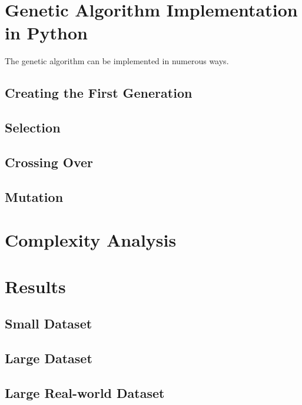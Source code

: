 \documentclass[UTF8]{report}
\begin{document}
\section{Genetic Algorithm Implementation in Python}

The genetic algorithm can be implemented in numerous ways. 

\subsection{Creating the First Generation}

\subsection{Selection}


\subsection{Crossing Over}

\subsection{Mutation}

\section{Complexity Analysis}

\section{Results}

\subsection{Small Dataset}

\subsection{Large Dataset}

\subsection{Large Real-world Dataset}
\end{document}
